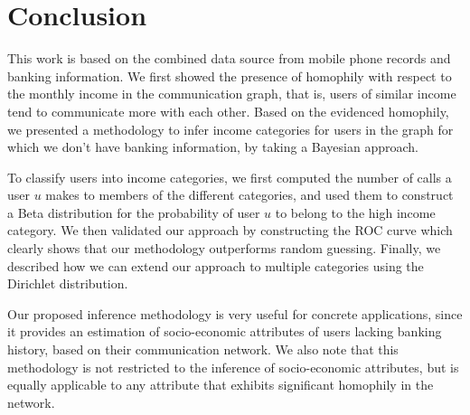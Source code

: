 \section{Conclusion}

This work is based on the combined data source 
from mobile phone records and banking information.
We first showed the presence of homophily with respect to the monthly income in the 
communication graph, that is, users of similar income tend to communicate more with each other. Based on the evidenced homophily, we presented a methodology to infer income categories for users in the graph for which we don't have 
banking information, by taking a Bayesian approach. 

To classify users into income categories, we first computed the number of calls a user $u$ makes to members of the different categories, and used them to construct a Beta distribution for the probability of user $u$ to belong to the high income category. We then validated our approach by constructing the ROC curve which clearly shows that our methodology outperforms random guessing.
Finally, we described how we can extend our approach to multiple categories using the Dirichlet distribution.

Our proposed inference methodology is very useful for concrete applications, since it provides an estimation of socio-economic attributes of users lacking banking history, based on their communication network. We also note that this methodology is not restricted to the inference of socio-economic attributes, but is equally applicable to any attribute that exhibits significant homophily in the network.

